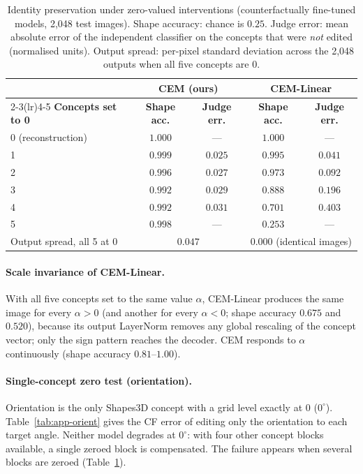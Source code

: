\begin{table}[h]
\centering\small
\caption{Identity preservation under zero-valued interventions (counterfactually
fine-tuned models, 2{,}048 test images). Shape accuracy: chance is $0.25$.
Judge error: mean absolute error of the independent classifier on the concepts
that were \emph{not} edited (normalised units). Output spread: per-pixel
standard deviation across the 2{,}048 outputs when all five concepts are $0$.}
\label{tab:app-zero-gen}
\begin{tabular}{lcccc}
\toprule
 & \multicolumn{2}{c}{\textbf{CEM (ours)}} & \multicolumn{2}{c}{\textbf{CEM-Linear}} \\
\cmidrule(lr){2-3}\cmidrule(lr){4-5}
\textbf{Concepts set to 0} & \textbf{Shape acc.} & \textbf{Judge err.} & \textbf{Shape acc.} & \textbf{Judge err.} \\
\midrule
0 (reconstruction) & $1.000$ & ---     & $1.000$ & ---     \\
1                  & $\mathbf{0.999}$ & $\mathbf{0.025}$ & $0.995$ & $0.041$ \\
2                  & $\mathbf{0.996}$ & $\mathbf{0.027}$ & $0.973$ & $0.092$ \\
3                  & $\mathbf{0.992}$ & $\mathbf{0.029}$ & $0.888$ & $0.196$ \\
4                  & $\mathbf{0.992}$ & $\mathbf{0.031}$ & $0.701$ & $0.403$ \\
5                  & $\mathbf{0.998}$ & ---     & $0.253$ & ---     \\
\midrule
Output spread, all 5 at 0 & \multicolumn{2}{c}{$0.047$} & \multicolumn{2}{c}{$0.000$ (identical images)} \\
\bottomrule
\end{tabular}
\end{table}

\paragraph{Scale invariance of CEM-Linear.} With all five concepts set to the
same value $\alpha$, CEM-Linear produces the same image for every
$\alpha > 0$ (and another for every $\alpha < 0$; shape accuracy $0.675$ and
$0.520$), because its output LayerNorm removes any global rescaling of the
concept vector; only the sign pattern reaches the decoder. CEM responds to
$\alpha$ continuously (shape accuracy $0.81$--$1.00$).

\paragraph{Single-concept zero test (orientation).} Orientation is the only
Shapes3D concept with a grid level exactly at $0$ ($0^\circ$).
Table~\ref{tab:app-orient} gives the CF error of editing only the orientation
to each target angle. Neither model degrades at $0^\circ$: with four other
concept blocks available, a single zeroed block is compensated. The failure
appears when several blocks are zeroed (Table~\ref{tab:app-zero-gen}).

